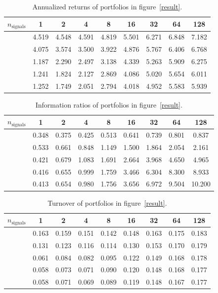 \documentclass{article}
\begin{document}
    \begin{table}[t]\centering
        \begin{tabular}{l c c c c c c c c}
        $n_\text{signals}$ & 1 & 2 & 4 & 8 & 16 & 32 & 64 & 128  \\ \hline
        & 4.519 & 4.548 & 4.591 & 4.819 & 5.501 & 6.271 & 6.848 & 7.182  \\
        & 4.075 & 3.574 & 3.500 & 3.922 & 4.876 & 5.767 & 6.406 & 6.768  \\
        & 1.187 & 2.290 & 2.497 & 3.138 & 4.339 & 5.263 & 5.909 & 6.275  \\
        & 1.241 & 1.824 & 2.127 & 2.869 & 4.086 & 5.020 & 5.654 & 6.011  \\
        & 1.252 & 1.749 & 2.051 & 2.794 & 4.018 & 4.952 & 5.583 & 5.939 
        \end{tabular}
        \caption{Annualized returns of portfolios in figure~\ref{result}.}
        \label{table:ret}
    \end{table}

    \begin{table}[t]\centering
        \begin{tabular}{l c c c c c c c c}
        $n_\text{signals}$ & 1 & 2 & 4 & 8 & 16 & 32 & 64 & 128  \\ \hline
        & 0.348 & 0.375 & 0.425 & 0.513 & 0.641 & 0.739 & 0.801 & 0.837  \\
        & 0.533 & 0.661 & 0.848 & 1.149 & 1.500 & 1.864 & 2.054 & 2.161  \\
        & 0.421 & 0.679 & 1.083 & 1.691 & 2.664 & 3.968 & 4.650 & 4.965  \\
        & 0.416 & 0.655 & 0.999 & 1.759 & 3.466 & 6.304 & 8.300 & 8.933  \\
        & 0.413 & 0.654 & 0.980 & 1.756 & 3.656 & 6.972 & 9.504 & 10.200 
        \end{tabular}
        \caption{Information ratios of portfolios in figure~\ref{result}.}
        \label{table:ir}
    \end{table}


    \begin{table}[t]\centering
        \begin{tabular}{l c c c c c c c c}
        $n_\text{signals}$ & 1 & 2 & 4 & 8 & 16 & 32 & 64 & 128  \\ \hline
        & 0.163 & 0.159 & 0.151 & 0.142 & 0.148 & 0.163 & 0.175 & 0.183  \\
        & 0.131 & 0.123 & 0.116 & 0.114 & 0.130 & 0.153 & 0.170 & 0.179  \\
        & 0.061 & 0.084 & 0.082 & 0.095 & 0.122 & 0.149 & 0.168 & 0.178  \\
        & 0.058 & 0.073 & 0.071 & 0.090 & 0.120 & 0.148 & 0.168 & 0.177  \\
        & 0.058 & 0.071 & 0.069 & 0.089 & 0.119 & 0.148 & 0.167 & 0.177 
        \end{tabular}
        \caption{Turnover of portfolios in figure~\ref{result}.}
        \label{table:tvr}
    \end{table}
\end{document}
